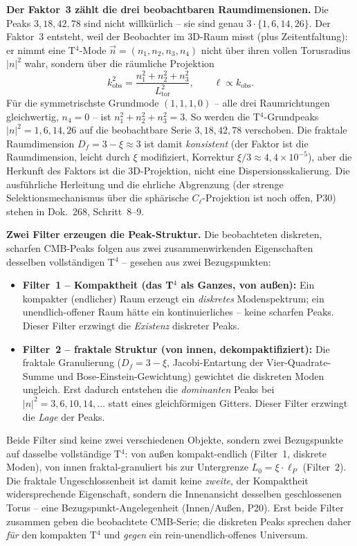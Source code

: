 \textbf{Der Faktor~3 zählt die drei beobachtbaren Raumdimensionen.}
Die Peaks $3, 18, 42, 78$ sind nicht willkürlich -- sie sind genau
$3 \cdot \{1, 6, 14, 26\}$. Der Faktor~3 entsteht, weil der Beobachter
im 3D-Raum misst (plus Zeitentfaltung): er nimmt eine T$^4$-Mode
$\vec{n} = (n_1, n_2, n_3, n_4)$ nicht über ihren vollen Torusradius
$|n|^2$ wahr, sondern über die räumliche Projektion
\[
  k_\mathrm{obs}^2 = \frac{n_1^2 + n_2^2 + n_3^2}{L_\mathrm{tor}^2},
  \qquad
  \ell \propto k_\mathrm{obs}.
\]
Für die symmetrischste Grundmode $(1,1,1,0)$ -- alle drei Raumrichtungen
gleichwertig, $n_4 = 0$ -- ist $n_1^2+n_2^2+n_3^2 = 3$. So werden die
T$^4$-Grundpeaks $|n|^2 = 1, 6, 14, 26$ auf die beobachtbare Serie
$3, 18, 42, 78$ verschoben. Die fraktale Raumdimension $D_f = 3 - \xi
\approx 3$ ist damit \emph{konsistent} (der Faktor ist die Raumdimension,
leicht durch $\xi$ modifiziert, Korrektur $\xi/3 \approx 4{,}4\times10^{-5}$),
aber die Herkunft des Faktors ist die 3D-Projektion, nicht eine
Dispersionsskalierung.
Die ausführliche Herleitung und die ehrliche Abgrenzung (der strenge
Selektionsmechanismus über die sphärische $C_\ell$-Projektion ist
noch offen, P30) stehen in Dok.~268, Schritt~8--9.

\textbf{Zwei Filter erzeugen die Peak-Struktur.} Die beobachteten
diskreten, scharfen CMB-Peaks folgen aus zwei zusammenwirkenden
Eigenschaften desselben vollständigen T$^4$ -- gesehen aus zwei
Bezugspunkten:

\begin{itemize}
  \item \textbf{Filter~1 -- Kompaktheit (das T$^4$ als Ganzes, von außen):}
        Ein kompakter (endlicher) Raum erzeugt ein \emph{diskretes}
        Modenspektrum; ein unendlich-offener Raum hätte ein
        kontinuierliches -- keine scharfen Peaks. Dieser Filter
        erzwingt die \emph{Existenz} diskreter Peaks.
  \item \textbf{Filter~2 -- fraktale Struktur (von innen, dekompaktifiziert):}
        Die fraktale Granulierung ($D_f = 3-\xi$, Jacobi-Entartung der
        Vier-Quadrate-Summe und Bose-Einstein-Gewichtung) gewichtet
        die diskreten Moden ungleich. Erst dadurch entstehen die
        \emph{dominanten} Peaks bei $|n|^2 = 3, 6, 10, 14, \ldots$
        statt eines gleichförmigen Gitters. Dieser Filter erzwingt die
        \emph{Lage} der Peaks.
\end{itemize}

Beide Filter sind keine zwei verschiedenen Objekte, sondern zwei
Bezugspunkte auf dasselbe vollständige T$^4$: von außen kompakt-endlich
(Filter~1, diskrete Moden), von innen fraktal-granuliert bis zur
Untergrenze $L_0 = \xi\cdot\ell_P$ (Filter~2). Die fraktale
Ungeschlossenheit ist damit keine \emph{zweite}, der Kompaktheit
widersprechende Eigenschaft, sondern die Innenansicht desselben
geschlossenen Torus -- eine Bezugspunkt-Angelegenheit (Innen/Außen,
P20). Erst beide Filter zusammen geben die beobachtete CMB-Serie;
die diskreten Peaks sprechen daher \emph{für} den kompakten T$^4$
und \emph{gegen} ein rein-unendlich-offenes Universum.

